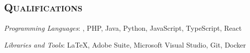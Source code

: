 \begin{resume}
\section{\textsc{Qualifications}}

\emph{Programming Languages}: \Cplusplus, PHP, Java, Python, JavaScript, TypeScript, React

\emph{Libraries and Tools}: \LaTeX, Adobe Suite, Microsoft Visual Studio, Git, Docker






\end{resume}
